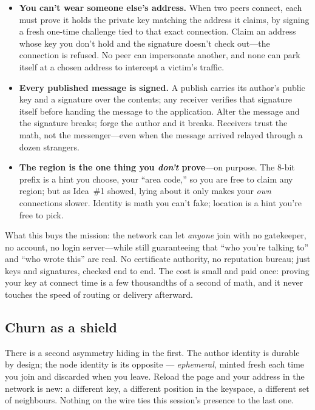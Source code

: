 \documentclass[nobib,justified]{tufte-handout}
\begin{document}
\begin{itemize}
\setlength{\itemsep}{2pt}
  \item \textbf{You can't wear someone else's address.} When two peers connect, each must prove it holds the private key matching the address it claims, by signing a fresh one-time challenge tied to that exact connection. Claim an address whose key you don't hold and the signature doesn't check out---the connection is refused. No peer can impersonate another, and none can park itself at a chosen address to intercept a victim's traffic.
  \item \textbf{Every published message is signed.} A publish carries its author's public key and a signature over the contents; any receiver verifies that signature itself before handing the message to the application. Alter the message and the signature breaks; forge the author and it breaks. Receivers trust the math, not the messenger---even when the message arrived relayed through a dozen strangers.
  \item \textbf{The region is the one thing you \emph{don't} prove}---on purpose. The 8-bit prefix is a hint you choose, your ``area code,'' so you are free to claim any region; but as Idea~\#1 showed, lying about it only makes your \emph{own} connections slower. Identity is math you can't fake; location is a hint you're free to pick.
\end{itemize}

What this buys the mission: the network can let \emph{anyone} join with no gatekeeper, no account, no login server---while still guaranteeing that ``who you're talking to'' and ``who wrote this'' are real. No certificate authority, no reputation bureau; just keys and signatures, checked end to end. The cost is small and paid once: proving your key at connect time is a few thousandths of a second of math, and it never touches the speed of routing or delivery afterward.

\subsection{Churn as a shield}

There is a second asymmetry hiding in the first. The author identity is durable
by design; the node identity is its opposite --- \emph{ephemeral}, minted fresh
each time you join and discarded when you leave. Reload the page and your
address in the network is new: a different key, a different position in the
keyspace, a different set of neighbours. Nothing on the wire ties this session's
presence to the last one.
\end{document}

